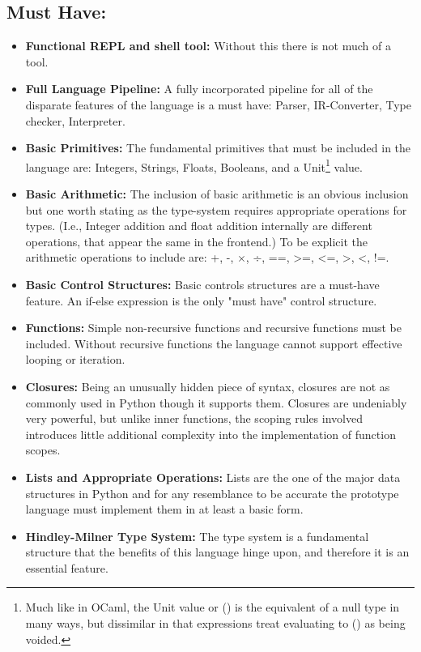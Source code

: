 \documentclass{l4proj}
\begin{document}
\subsection*{Must Have:}
\begin{itemize}
    \item \textbf{Functional REPL and shell tool:} Without this there is not much of a tool.
    \item \textbf{Full Language Pipeline:} A fully incorporated pipeline for all of the disparate features of the language is a must have: Parser, IR-Converter, Type checker, Interpreter.
    \item \textbf{Basic Primitives:} The fundamental primitives that must be included in the language are: Integers, Strings, Floats, Booleans, and a Unit\footnote{Much like in OCaml, the Unit value or () is the equivalent of a null type in many ways, but dissimilar in that expressions treat evaluating to () as being voided.} value.
    \item \textbf{Basic Arithmetic:} The inclusion of basic arithmetic is an obvious inclusion but one worth stating as the type-system requires appropriate operations for types.
    (I.e., Integer addition and float addition internally are different operations, that appear the same in the frontend.)
    To be explicit the arithmetic operations to include are: +, -, $\times$, ÷, ==, >=, <=, >, <, !=.
    \item \textbf{Basic Control Structures:} Basic controls structures are a must-have feature. An if-else expression is the only "must have" control structure.
    \item \textbf{Functions:} Simple non-recursive functions and recursive functions must be included. Without recursive functions the language cannot support effective looping or iteration.
    \item \textbf{Closures:} Being an unusually hidden piece of syntax, closures are not as commonly used in Python though it supports them.
    Closures are undeniably very powerful, but unlike inner functions, the scoping rules involved introduces little additional complexity into the implementation of function scopes. 
    \item \textbf{Lists and Appropriate Operations:} Lists are the one of the major data structures in Python and for any resemblance to be accurate the prototype language must implement them in at least a basic form.
    \item \textbf{Hindley-Milner Type System:} The type system is a fundamental structure that the benefits of this language hinge upon, and therefore it is an essential feature.
\end{itemize}
\end{document}
